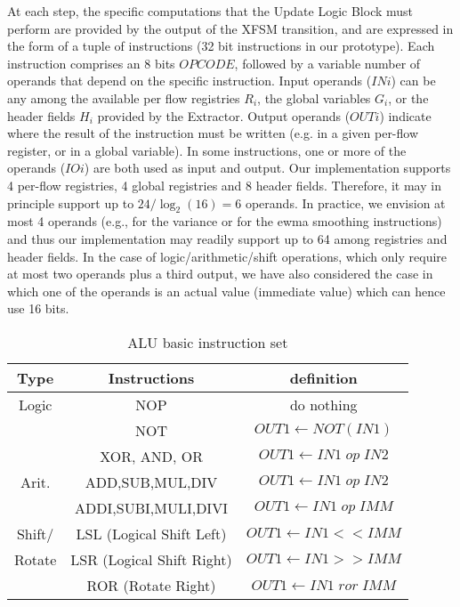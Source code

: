 \documentclass{sig-alternate}
\begin{document}
At each step, the specific computations that the Update Logic Block must perform are provided by the output of the XFSM transition, and are expressed in the form of a tuple of instructions (32 bit instructions in our prototype). Each instruction comprises an 8 bits $OPCODE$, followed by a variable number of operands that depend on the specific instruction. Input operands ($INi$) can be any among the available per flow registries $R_i$, the global variables $G_i$, or the header fields $H_i$ provided by the Extractor. Output operands ($OUTi$) indicate where the result of the instruction must be written (e.g. in a given per-flow register, or in a global variable). In some instructions, one or more of the operands ($IOi$) are both used as input and output. Our implementation supports 4 per-flow registries, 4 global registries and 8 header fields. Therefore, it may in principle support up to $24/\log_2(16)=6$ operands. In practice, we envision at most 4 operands (e.g., for the variance or for the ewma smoothing instructions) and thus our implementation may readily support up to 64 among registries and header fields. In the case of logic/arithmetic/shift operations, which only require at most two operands plus a third output, we have also considered the case in which one of the operands is an actual value (immediate value) which can hence use 16 bits.

\begin{table}[t]
\vspace{-.6em}
\centering
\small
\begin{tabular}{|c|c|c|}
  \hline
  Type & Instructions & definition \\
\hline
Logic & NOP & do nothing\\
   & NOT & $OUT1 \leftarrow NOT(IN1)$\\
 & XOR, AND, OR & $OUT1 \leftarrow IN1\; op\; IN2$\\
\hline
Arit. & ADD,SUB,MUL,DIV     & $OUT1 \leftarrow IN1\; op\; IN2$\\
    & ADDI,SUBI,MULI,DIVI & $OUT1 \leftarrow IN1\; op\; IMM$\\
\hline
Shift/ & LSL (Logical Shift Left) & $OUT1 \leftarrow IN1 << IMM$ \\ 
Rotate  & LSR (Logical Shift Right) & $OUT1 \leftarrow IN1 >> IMM$\\
						 & ROR (Rotate Right)  & $OUT1 \leftarrow IN1\; ror\; IMM$ \\
\hline
\end{tabular}
      	  \vspace{-1em}
\caption{ALU basic instruction set}
      	  \vspace{-1em}

\label{T:ALU}
\end{table}
\end{document}
